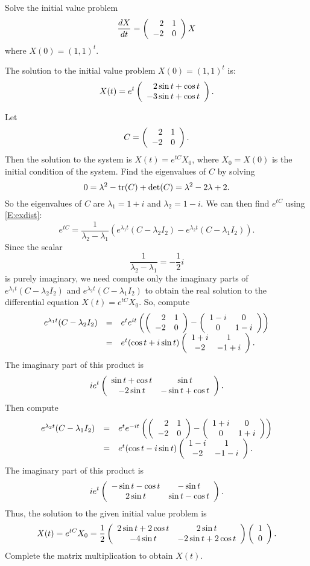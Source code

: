 \documentclass{ximera}
\begin{document}
\begin{exercise} \label{c6.6.4}
Solve the initial value problem
\[
\frac{dX}{dt} =  \left(\begin{array}{rr} 2 & 1\\ -2 &0\end{array}\right)X
\]
where $X(0)=(1,1)^t$.

\begin{solution}

\ans The solution to the initial value problem $X(0) = (1,1)^t$ is:
\[
X(t) = e^t\left(\begin{array}{r} 2\sin{t} + \cos{t} \\ -3\sin{t} + \cos{t}\end{array}\right).
\]

\soln Let
\[
C = \left(\begin{array}{rr} 2 & 1\\ -2 &0\end{array}\right).
\]
Then the solution to the system is $X(t) = e^{tC}X_0$, where
$X_0 = X(0)$ is the initial condition of the system.
Find the eigenvalues of $C$ by solving
\[
0 = \lambda^2 - {\rm tr}(C) + \det(C) = \lambda^2 - 2\lambda + 2.
\]
So the eigenvalues of $C$ are $\lambda_1 = 1 + i$ and $\lambda_2 = 1 - i$.
We can then find $e^{tC}$ using 
\eqref{E:exdist}:
\[
e^{tC} = \frac{1}{\lambda_2 - \lambda_1}(e^{\lambda_1 t}(C -
\lambda_2 I_2) - e^{\lambda_2 t}(C - \lambda_1 I_2)).
\]
Since the scalar
\[
\frac{1}{\lambda_2 - \lambda_1} = -\frac{1}{2}i
\]
is purely imaginary, we need compute only the imaginary parts of
$e^{\lambda_1 t}(C - \lambda_2 I_2)$ and $e^{\lambda_2 t}(C - \lambda_1 I_2)$
to obtain the real solution to the differential equation $X(t) = e^{tC}X_0$.
So, compute
\[
\begin{array}{rcl}
e^{\lambda_1 t}(C - \lambda_2 I_2)
& = & e^{t}e^{it}\left(\left(\begin{array}{rr} 2 & 1\\ -2 &0\end{array}\right) - \left(\begin{array}{cc} 1 - i & 0\\ 0 &1 - i\end{array}\right)
\right) \\
& = & e^{t}(\cos t + i\sin t)\left(\begin{array}{cc} 1 + i & 1\\ -2 &-1 + i\end{array}\right).
\end{array}
\]
The imaginary part of this product is
\[
ie^t\left(\begin{array}{cc} \sin t + \cos t & \sin t\\ -2\sin t &-\sin t + \cos t\end{array}\right).
\]
Then compute
\[
\begin{array}{rcl}
e^{\lambda_2 t}(C - \lambda_1 I_2)
& = & e^{t}e^{-it}\left(\left(\begin{array}{rr} 2 & 1\\ -2 &0\end{array}\right) - \left(\begin{array}{cc} 1 + i & 0\\ 0 &1 + i\end{array}\right)
\right) \\
& = & e^{t}(\cos t - i\sin t)\left(\begin{array}{cc} 1 - i & 1\\ -2 &-1 - i\end{array}\right).
\end{array}
\]
The imaginary part of this product is
\[
ie^t\left(\begin{array}{cc} -\sin t - \cos t & -\sin t\\ 2\sin t &\sin t - \cos t\end{array}\right).
\]
Thus, the solution to the given initial value problem is
\[
X(t) = e^{tC}X_0 =
\frac{1}{2}\left(\begin{array}{cc} 2\sin t + 2\cos t & 2\sin t\\ -4\sin t &-2\sin t + 2\cos t\end{array}\right)
\left(\begin{array}{r} 1 \\ 0\end{array}\right).
\]
Complete the matrix multiplication to obtain $X(t)$.


\end{solution}
\end{exercise}
\end{document}
